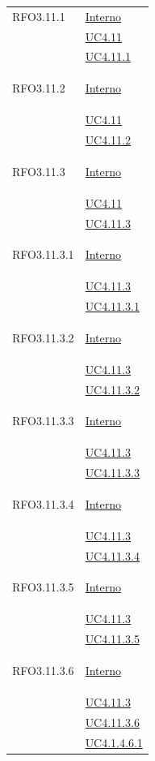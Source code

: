 \begin{longtable}{|>{\centering}m{5cm}|m{5cm}<{\centering}|}
\hypertarget{RFO3.11.1}{RFO3.11.1} & \hyperlink{Interno}{Interno}\\
& \hyperref[UC4.11]{UC4.11}\\
& \hyperref[UC4.11.1]{UC4.11.1}\\ \hline

\hypertarget{RFO3.11.2}{RFO3.11.2} & \hyperlink{Interno}{Interno}\\
& \hyperref[UC4.11]{UC4.11}\\
& \hyperref[UC4.11.2]{UC4.11.2}\\ \hline

\hypertarget{RFO3.11.3}{RFO3.11.3} & \hyperlink{Interno}{Interno}\\
& \hyperref[UC4.11]{UC4.11}\\
& \hyperref[UC4.11.3]{UC4.11.3}\\ \hline

\hypertarget{RFO3.11.3.1}{RFO3.11.3.1} & \hyperlink{Interno}{Interno}\\
& \hyperref[UC4.11.3]{UC4.11.3}\\
& \hyperref[UC4.11.3.1]{UC4.11.3.1}\\ \hline

\hypertarget{RFO3.11.3.2}{RFO3.11.3.2} & \hyperlink{Interno}{Interno}\\
& \hyperref[UC4.11.3]{UC4.11.3}\\
& \hyperref[UC4.11.3.2]{UC4.11.3.2}\\ \hline

\hypertarget{RFO3.11.3.3}{RFO3.11.3.3} & \hyperlink{Interno}{Interno}\\
& \hyperref[UC4.11.3]{UC4.11.3}\\
& \hyperref[UC4.11.3.3]{UC4.11.3.3}\\ \hline

\hypertarget{RFO3.11.3.4}{RFO3.11.3.4} & \hyperlink{Interno}{Interno}\\
& \hyperref[UC4.11.3]{UC4.11.3}\\
& \hyperref[UC4.11.3.4]{UC4.11.3.4}\\ \hline

\hypertarget{RFO3.11.3.5}{RFO3.11.3.5} & \hyperlink{Interno}{Interno}\\
& \hyperref[UC4.11.3]{UC4.11.3}\\
& \hyperref[UC4.11.3.5]{UC4.11.3.5}\\ \hline

\hypertarget{RFO3.11.3.6}{RFO3.11.3.6} & \hyperlink{Interno}{Interno}\\
& \hyperref[UC4.11.3]{UC4.11.3}\\
& \hyperref[UC4.11.3.6]{UC4.11.3.6}\\
& \hyperref[UC4.1.4.6.1]{UC4.1.4.6.1}\\ \hline


\end{longtable}
